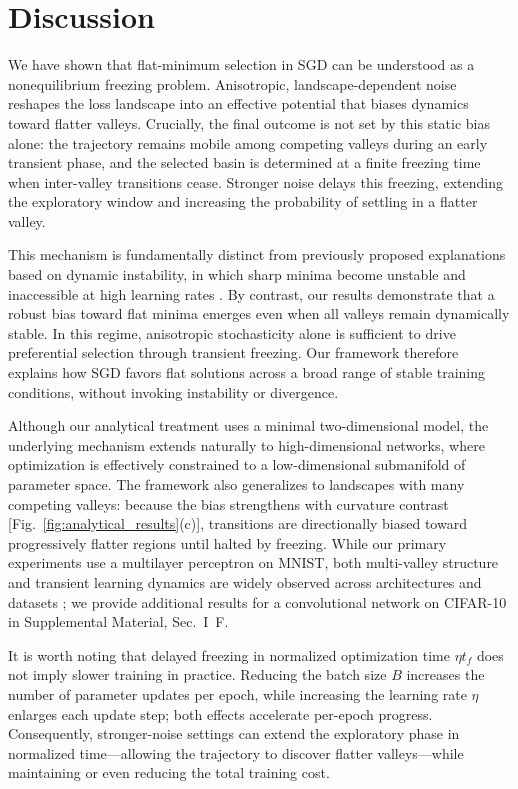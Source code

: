 \documentclass[aps,prx,reprint,superscriptaddress,longbibliography,nofootinbib,floatfix]{revtex4-2}
\begin{document}
\section{Discussion}
We have shown that flat-minimum selection in SGD can be understood as a nonequilibrium freezing problem. Anisotropic, landscape-dependent noise reshapes the loss landscape into an effective potential that biases dynamics toward flatter valleys. Crucially, the final outcome is not set by this static bias alone: the trajectory remains mobile among competing valleys during an early transient phase, and the selected basin is determined at a finite freezing time when inter-valley transitions cease. Stronger noise delays this freezing, extending the exploratory window and increasing the probability of settling in a flatter valley.

This mechanism is fundamentally distinct from previously proposed explanations based on dynamic instability, in which sharp minima become unstable and inaccessible at high learning rates \cite{wuHowSGDSelects2018}. By contrast, our results demonstrate that a robust bias toward flat minima emerges even when all valleys remain dynamically stable. In this regime, anisotropic stochasticity alone is sufficient to drive preferential selection through transient freezing. Our framework therefore explains how SGD favors flat solutions across a broad range of stable training conditions, without invoking instability or divergence.

Although our analytical treatment uses a minimal two-dimensional model, the underlying mechanism extends naturally to high-dimensional networks, where optimization is effectively constrained to a low-dimensional submanifold of parameter space. The framework also generalizes to landscapes with many competing valleys: because the bias strengthens with curvature contrast [Fig.~\ref{fig:analytical_results}(c)], transitions are directionally biased toward progressively flatter regions until halted by freezing. While our primary experiments use a multilayer perceptron on MNIST, both multi-valley structure and transient learning dynamics are widely observed across architectures and datasets \cite{fortLargeScaleStructure2019,garipovLossSurfacesMode2018,achilleCriticalLearningPeriods2019,jastrzebskiBreakEvenPointOptimization2020,kalraPhaseDiagramEarly2023}; we provide additional results for a convolutional network on CIFAR-10 in Supplemental Material, Sec.~I~F.

It is worth noting that delayed freezing in normalized optimization time $\eta t_f$ does not imply slower training in practice. Reducing the batch size $B$ increases the number of parameter updates per epoch, while increasing the learning rate $\eta$ enlarges each update step; both effects accelerate per-epoch progress. Consequently, stronger-noise settings can extend the exploratory phase in normalized time---allowing the trajectory to discover flatter valleys---while maintaining or even reducing the total training cost.
\end{document}
